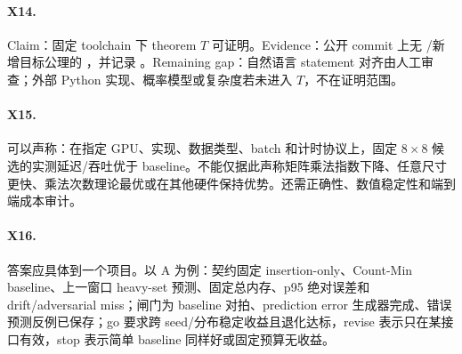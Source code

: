 \paragraph{X14.}
Claim：固定 toolchain 下 theorem $T$ 可证明。Evidence：公开 commit 上无 /新增目标公理的 ，并记录 。Remaining gap：自然语言 statement 对齐由人工审查；外部 Python 实现、概率模型或复杂度若未进入 $T$，不在证明范围。

\paragraph{X15.}
可以声称：在指定 GPU、实现、数据类型、batch 和计时协议上，固定 $8\times8$ 候选的实测延迟/吞吐优于 baseline。不能仅据此声称矩阵乘法指数下降、任意尺寸更快、乘法次数理论最优或在其他硬件保持优势。还需正确性、数值稳定性和端到端成本审计。

\paragraph{X16.}
答案应具体到一个项目。以 A 为例：契约固定 insertion-only、Count-Min baseline、上一窗口 heavy-set 预测、固定总内存、p95 绝对误差和 drift/adversarial miss；闸门为 baseline 对拍、prediction error 生成器完成、错误预测反例已保存；go 要求跨 seed/分布稳定收益且退化达标，revise 表示只在某接口有效，stop 表示简单 baseline 同样好或固定预算无收益。
